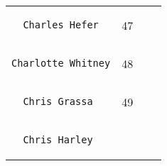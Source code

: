 \documentclass[]{article}
\begin{document}
\begin{longtable}[c]{@{}llll@{}}
\begin{minipage}[t]{0.39\columnwidth}\raggedright
\begin{verbatim}
  Charles Hefer
\end{verbatim}
\end{minipage} & \begin{minipage}[t]{0.10\columnwidth}\raggedright
47
\end{minipage} & \begin{minipage}[t]{0.13\columnwidth}\raggedright
\end{minipage} & \begin{minipage}[t]{0.15\columnwidth}\raggedright
\end{minipage}
\\\noalign{\medskip}
\begin{minipage}[t]{0.39\columnwidth}\raggedright
\begin{verbatim}
Charlotte Whitney
\end{verbatim}
\end{minipage} & \begin{minipage}[t]{0.10\columnwidth}\raggedright
48
\end{minipage} & \begin{minipage}[t]{0.13\columnwidth}\raggedright
\end{minipage} & \begin{minipage}[t]{0.15\columnwidth}\raggedright
\end{minipage}
\\\noalign{\medskip}
\begin{minipage}[t]{0.39\columnwidth}\raggedright
\begin{verbatim}
  Chris Grassa
\end{verbatim}
\end{minipage} & \begin{minipage}[t]{0.10\columnwidth}\raggedright
49
\end{minipage} & \begin{minipage}[t]{0.13\columnwidth}\raggedright
\end{minipage} & \begin{minipage}[t]{0.15\columnwidth}\raggedright
\end{minipage}
\\\noalign{\medskip}
\begin{minipage}[t]{0.39\columnwidth}\raggedright
\begin{verbatim}
  Chris Harley
\end{verbatim}
\end{minipage} & \begin{minipage}[t]{0.10\columnwidth}\raggedright

\end{minipage}
\end{longtable}
\end{document}
